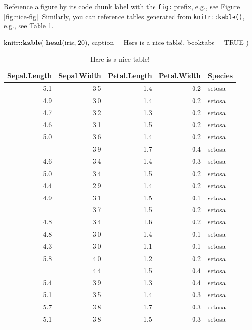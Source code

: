 \documentclass[
]{book}
\newenvironment{Shaded}{\begin{snugshade}}{\end{snugshade}}
\newcommand{\AttributeTok}[1]{\textcolor[rgb]{0.13,0.29,0.53}{#1}}
\newcommand{\ConstantTok}[1]{\textcolor[rgb]{0.56,0.35,0.01}{#1}}
\newcommand{\DecValTok}[1]{\textcolor[rgb]{0.00,0.00,0.81}{#1}}
\newcommand{\FunctionTok}[1]{\textcolor[rgb]{0.13,0.29,0.53}{\textbf{#1}}}
\newcommand{\NormalTok}[1]{#1}
\newcommand{\SpecialCharTok}[1]{\textcolor[rgb]{0.81,0.36,0.00}{\textbf{#1}}}
\newcommand{\StringTok}[1]{\textcolor[rgb]{0.31,0.60,0.02}{#1}}
\begin{document}
Reference a figure by its code chunk label with the \texttt{fig:} prefix, e.g., see Figure \ref{fig:nice-fig}. Similarly, you can reference tables generated from \texttt{knitr::kable()}, e.g., see Table \ref{tab:nice-tab}.

\begin{Shaded}
\begin{Highlighting}[]
\NormalTok{knitr}\SpecialCharTok{::}\FunctionTok{kable}\NormalTok{(}
  \FunctionTok{head}\NormalTok{(iris, }\DecValTok{20}\NormalTok{), }\AttributeTok{caption =} \StringTok{\textquotesingle{}Here is a nice table!\textquotesingle{}}\NormalTok{,}
  \AttributeTok{booktabs =} \ConstantTok{TRUE}
\NormalTok{)}
\end{Highlighting}
\end{Shaded}

\begin{table}

\caption{\label{tab:nice-tab}Here is a nice table!}
\centering
\begin{tabular}[t]{rrrrl}
\toprule
Sepal.Length & Sepal.Width & Petal.Length & Petal.Width & Species\\
\midrule
5.1 & 3.5 & 1.4 & 0.2 & setosa\\
4.9 & 3.0 & 1.4 & 0.2 & setosa\\
4.7 & 3.2 & 1.3 & 0.2 & setosa\\
4.6 & 3.1 & 1.5 & 0.2 & setosa\\
5.0 & 3.6 & 1.4 & 0.2 & setosa\\
\addlinespace
5.4 & 3.9 & 1.7 & 0.4 & setosa\\
4.6 & 3.4 & 1.4 & 0.3 & setosa\\
5.0 & 3.4 & 1.5 & 0.2 & setosa\\
4.4 & 2.9 & 1.4 & 0.2 & setosa\\
4.9 & 3.1 & 1.5 & 0.1 & setosa\\
\addlinespace
5.4 & 3.7 & 1.5 & 0.2 & setosa\\
4.8 & 3.4 & 1.6 & 0.2 & setosa\\
4.8 & 3.0 & 1.4 & 0.1 & setosa\\
4.3 & 3.0 & 1.1 & 0.1 & setosa\\
5.8 & 4.0 & 1.2 & 0.2 & setosa\\
\addlinespace
5.7 & 4.4 & 1.5 & 0.4 & setosa\\
5.4 & 3.9 & 1.3 & 0.4 & setosa\\
5.1 & 3.5 & 1.4 & 0.3 & setosa\\
5.7 & 3.8 & 1.7 & 0.3 & setosa\\
5.1 & 3.8 & 1.5 & 0.3 & setosa\\
\bottomrule
\end{tabular}
\end{table}
\end{document}
